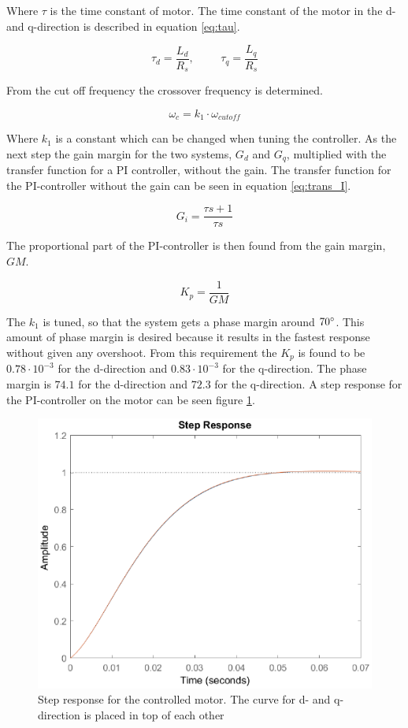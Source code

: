 Where $\tau$ is the time constant of motor. The time constant of the motor in the d- and q-direction is described in equation \ref{eq:tau}.

\begin{equation}
    \label{eq:tau}
    \tau_d = \frac{L_d}{R_s}
    , \hspace{1cm}
    \tau_q = \frac{L_q}{R_s}
\end{equation}

From the cut off frequency the crossover frequency is determined.

\begin{equation}
    \label{eq:crossover}
     \omega_c = k_1 \cdot \omega_{cutoff}
\end{equation}

Where $k_1$ is a constant which can be changed when tuning the controller.
As the next step the gain margin for the two systems, $G_d$ and $G_q$, multiplied with the transfer function for a PI controller, without the gain. The transfer function for the PI-controller without the gain can be seen in equation \ref{eq:trans_I}.

\begin{equation}
    \label{eq:trans_I}
    G_i = \frac{\tau s + 1}{\tau s}
\end{equation}

The proportional part of the PI-controller is then found from the gain margin, $GM$.

\begin{equation}
    \label{eq:gain}
    K_p = \frac{1}{GM} 
\end{equation}

The $k_1$ is tuned, so that the system gets a phase margin around $70 \degree$. This amount of phase margin is desired because it results in the fastest response without given any overshoot. From this requirement the $K_p$ is found to be $0.78 \cdot 10^{-3}$ for the d-direction and $0.83 \cdot 10^{-3}$ for the q-direction. The phase margin is $74.1$ for the d-direction and $72.3$ for the q-direction.
A step response for the PI-controller on the motor can be seen figure \ref{fig:step}.

\begin{figure}[H]
	\centering
	\includegraphics[width=0.75\linewidth]{pictures/control/step_PI.eps}
	\caption{Step response for the controlled motor. The curve for d- and q-direction is placed in top of each other}
	\label{fig:step}
\end{figure}





